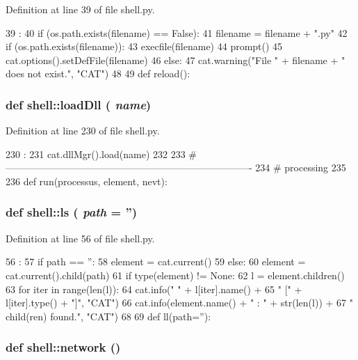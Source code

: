Definition at line 39 of file shell.py.


\begin{DoxyCode}
39                   :
40   if (os.path.exists(filename) == False):
41     filename = filename + ".py"
42   if (os.path.exists(filename)):
43     execfile(filename)
44     prompt()
45     cat.options().setDefFile(filename)
46   else:
47     cat.warning("File " + filename + " does not exist.", "CAT")
48 
49 
def reload():
\end{DoxyCode}
\hypertarget{namespaceshell_a92a046c771a92b681d7df839ca0ad36c}{
\subsubsection[{loadDll}]{\setlength{\rightskip}{0pt plus 5cm}def shell::loadDll ( {\em name})}}
\label{namespaceshell_a92a046c771a92b681d7df839ca0ad36c}


Definition at line 230 of file shell.py.


\begin{DoxyCode}
230                  :
231   cat.dllMgr().load(name)
232 
233 #----------------------------------------------------------------------------
234 # processing
235 
236 
def run(processus, element, nevt):
\end{DoxyCode}
\hypertarget{namespaceshell_a54a12b6d3621825fa1061475646836bf}{
\subsubsection[{ls}]{\setlength{\rightskip}{0pt plus 5cm}def shell::ls ( {\em path} = {\ttfamily ''})}}
\label{namespaceshell_a54a12b6d3621825fa1061475646836bf}


Definition at line 56 of file shell.py.


\begin{DoxyCode}
56                :
57   if path == '':
58     element = cat.current()
59   else:
60     element = cat.current().child(path)
61   if type(element) != None:
62     l = element.children()
63     for iter in range(len(l)):
64       cat.info("    " + l[iter].name() +
65                " [" + l[iter].type() + "]", "CAT")
66     cat.info(element.name() + " :  " + str(len(l)) +
67              " child(ren) found.", "CAT")
68 
69 
def ll(path=''):
\end{DoxyCode}
\hypertarget{namespaceshell_a853b1fcfcd4bfff566a3daeebb30bc5c}{
\subsubsection[{network}]{\setlength{\rightskip}{0pt plus 5cm}def shell::network ()}}
\label{namespaceshell_a853b1fcfcd4bfff566a3daeebb30bc5c}


